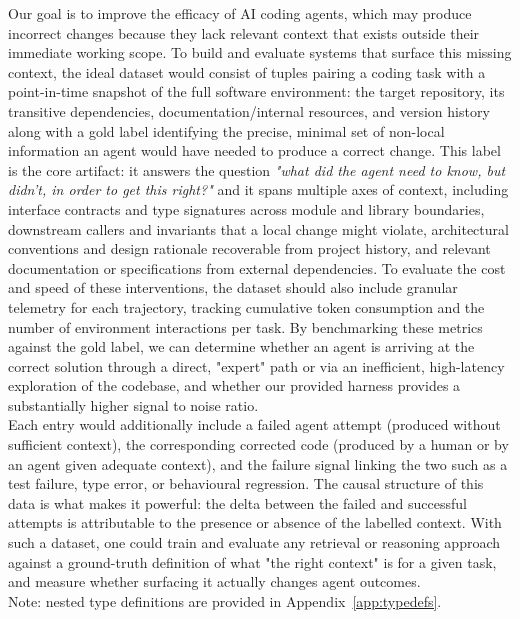 \documentclass[a4paper,12pt]{article}
\begin{document}
Our goal is to improve the efficacy of AI coding agents, which may produce incorrect changes because they lack relevant context that exists outside their immediate working scope. To build and evaluate systems that surface this missing context, the ideal dataset would consist of tuples pairing a coding task with a point-in-time snapshot of the full software environment: the target repository, its transitive dependencies, documentation/internal resources, and version history along with a gold label identifying the precise, minimal set of non-local information an agent would have needed to produce a correct change. This label is the core artifact: it answers the question \textit{"what did the agent need to know, but didn't, in order to get this right?"} and it spans multiple axes of context, including interface contracts and type signatures across module and library boundaries, downstream callers and invariants that a local change might violate, architectural conventions and design rationale recoverable from project history, and relevant documentation or specifications from external dependencies. To evaluate the cost and speed of these interventions, the dataset should also include granular telemetry for each trajectory, tracking cumulative token consumption and the number of environment interactions per task. By benchmarking these metrics against the gold label, we can determine whether an agent is arriving at the correct solution through a direct, "expert" path or via an inefficient, high-latency exploration of the codebase, and whether our provided harness provides a substantially higher signal to noise ratio.\\


\noindent Each entry would additionally include a failed agent attempt (produced without sufficient context), the corresponding corrected code (produced by a human or by an agent given adequate context), and the failure signal linking the two such as a test failure, type error, or behavioural regression. The causal structure of this data is what makes it powerful: the delta between the failed and successful attempts is attributable to the presence or absence of the labelled context. With such a dataset, one could train and evaluate any retrieval or reasoning approach against a ground-truth definition of what "the right context" is for a given task, and measure whether surfacing it actually changes agent outcomes.\\

\noindent Note: nested type definitions are provided in Appendix~\ref{app:typedefs}.
\end{document}
